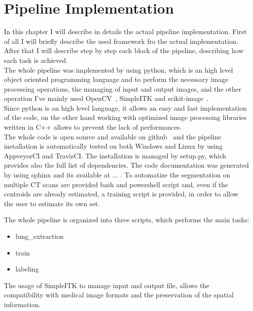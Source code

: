 
	
	\section{Pipeline Implementation}
	
	In this chapter I will describe in details the actual pipeline implementation. First of all I will briefly describe the used framework fro the actual implementation. After that I will describe step by step each block of the pipeline, describing how each task is achieved.\\
	
	The whole pipeline was implemented by using python, which is an high level object oriented programming language and to perform the necessary image processing operations, the managing of input and output images, and the other operation I've mainly used OpenCV~\cite{OpenCV}, SimpleITK and scikit-image~\cite{scikit-image}.\\
	Since python is an high level language, it allows an easy and fast implementation of the code, on the other hand working with optimized image processing libraries written in C++ allows to prevent the lack of performances.\\
		
	The whole code is open source and available on github~\cite{REP:CTLungSeg} and the pipeline installation is automatically tested on both Windows and Linux by using AppveyorCI and TravisCI.  The installation is managed by setup.py, which provides also the full list of dependencies. The code documentation was generated by using sphinx and its available at ... . To automatize the segmentation on multiple CT scans are provided bash and powershell script and,  even if the centroids are already estimated, a training script is provided, in order to allow the user to estimate its own set.
	
	The whole pipeline is organized into three scripts, which performs the main tasks: 
	\begin{itemize}
		\item lung\_extraction
		\item train
		\item labeling
	\end{itemize}

	The usage of SimpleITK to manage input and output file, allows the compatibility with medical image formats and the preservation of the spatial information.
 
